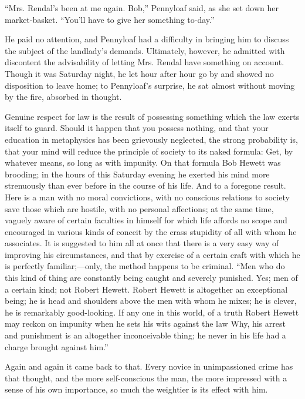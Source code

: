 ``Mrs. Rendal's been at me again. Bob,'' Pennyloaf said, as she set down
her market-basket. ``You'll have to give her something to-day.''

{\protect\hypertarget{235}{}{}}He paid no attention, and Pennyloaf had a
difficulty in bringing him to discuss the subject of the landlady's
demands. Ultimately, however, he admitted with discontent the
advisability of letting Mrs. Rendal have something on account. Though it
was Saturday night, he let hour after hour go by and showed no
disposition to leave home; to Pennyloaf's surprise, he sat almost
without moving by the fire, absorbed in thought.

Genuine respect for law is the result of possessing something which the
law exerts itself to guard. Should it happen that you possess nothing,
and that your education in metaphysics has been grievously neglected,
the strong probability is, that your mind will reduce the principle of
society to its naked formula: Get, by whatever means, so long as with
impunity. On that formula Bob Hewett was brooding; in the hours of this
Saturday evening he exerted his mind more strenuously than ever before
in the course of his life. And to a foregone result. Here is a man with
no moral convictions, with no conscious
{\protect\hypertarget{236}{}{}}relations to society save those which are
hostile, with no personal affections; at the same time, vaguely aware of
certain faculties in himself for which life affords no scope and
encouraged in various kinds of conceit by the crass stupidity of all
with whom he associates. It is suggested to him all at once that there
is a very easy way of improving his circumstances, and that by exercise
of a certain craft with which he is perfectly familiar;---only, the
method happens to be criminal. ``Men who do this kind of thing are
constantly being caught and severely punished. Yes; men of a certain
kind; not Robert Hewett. Robert Hewett is altogether an exceptional
being; he is head and shoulders above the men with whom he mixes; he is
clever, he is remarkably good-looking. If any one in this world, of a
truth Robert Hewett may reckon on impunity when he sets his wits against
the law Why, his arrest and punishment is an altogether inconceivable
thing; he never in his life had a charge brought against him.''

{\protect\hypertarget{237}{}{}}Again and again it came back to that.
Every novice in unimpassioned crime has that thought, and the more
self-conscious the man, the more impressed with a sense of his own
importance, so much the weightier is its effect with him.

